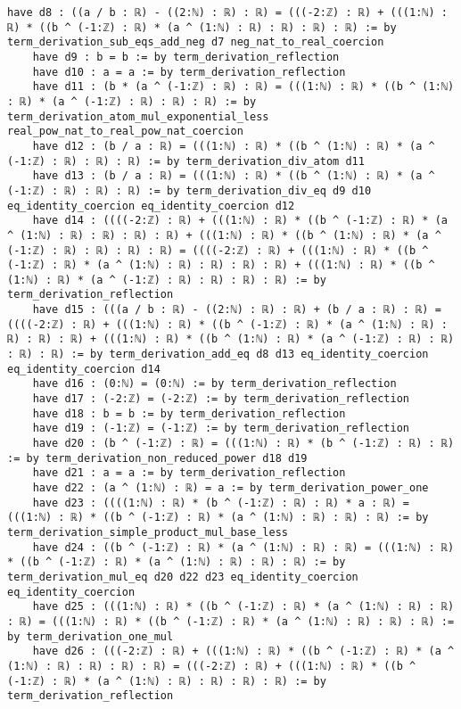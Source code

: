 \documentclass{article}
\begin{document}
\begin{tcolorbox}[colback=white!10, width=\linewidth]
\begin{lstlisting}[language=Lean4]
    have d8 : ((a / b : ℝ) - ((2:ℕ) : ℝ) : ℝ) = (((-2:ℤ) : ℝ) + (((1:ℕ) : ℝ) * ((b ^ (-1:ℤ) : ℝ) * (a ^ (1:ℕ) : ℝ) : ℝ) : ℝ) : ℝ) := by term_derivation_sub_eqs_add_neg d7 neg_nat_to_real_coercion
    have d9 : b = b := by term_derivation_reflection
    have d10 : a = a := by term_derivation_reflection
    have d11 : (b * (a ^ (-1:ℤ) : ℝ) : ℝ) = (((1:ℕ) : ℝ) * ((b ^ (1:ℕ) : ℝ) * (a ^ (-1:ℤ) : ℝ) : ℝ) : ℝ) := by term_derivation_atom_mul_exponential_less real_pow_nat_to_real_pow_nat_coercion
    have d12 : (b / a : ℝ) = (((1:ℕ) : ℝ) * ((b ^ (1:ℕ) : ℝ) * (a ^ (-1:ℤ) : ℝ) : ℝ) : ℝ) := by term_derivation_div_atom d11
    have d13 : (b / a : ℝ) = (((1:ℕ) : ℝ) * ((b ^ (1:ℕ) : ℝ) * (a ^ (-1:ℤ) : ℝ) : ℝ) : ℝ) := by term_derivation_div_eq d9 d10 eq_identity_coercion eq_identity_coercion d12
    have d14 : ((((-2:ℤ) : ℝ) + (((1:ℕ) : ℝ) * ((b ^ (-1:ℤ) : ℝ) * (a ^ (1:ℕ) : ℝ) : ℝ) : ℝ) : ℝ) + (((1:ℕ) : ℝ) * ((b ^ (1:ℕ) : ℝ) * (a ^ (-1:ℤ) : ℝ) : ℝ) : ℝ) : ℝ) = ((((-2:ℤ) : ℝ) + (((1:ℕ) : ℝ) * ((b ^ (-1:ℤ) : ℝ) * (a ^ (1:ℕ) : ℝ) : ℝ) : ℝ) : ℝ) + (((1:ℕ) : ℝ) * ((b ^ (1:ℕ) : ℝ) * (a ^ (-1:ℤ) : ℝ) : ℝ) : ℝ) : ℝ) := by term_derivation_reflection
    have d15 : (((a / b : ℝ) - ((2:ℕ) : ℝ) : ℝ) + (b / a : ℝ) : ℝ) = ((((-2:ℤ) : ℝ) + (((1:ℕ) : ℝ) * ((b ^ (-1:ℤ) : ℝ) * (a ^ (1:ℕ) : ℝ) : ℝ) : ℝ) : ℝ) + (((1:ℕ) : ℝ) * ((b ^ (1:ℕ) : ℝ) * (a ^ (-1:ℤ) : ℝ) : ℝ) : ℝ) : ℝ) := by term_derivation_add_eq d8 d13 eq_identity_coercion eq_identity_coercion d14
    have d16 : (0:ℕ) = (0:ℕ) := by term_derivation_reflection
    have d17 : (-2:ℤ) = (-2:ℤ) := by term_derivation_reflection
    have d18 : b = b := by term_derivation_reflection
    have d19 : (-1:ℤ) = (-1:ℤ) := by term_derivation_reflection
    have d20 : (b ^ (-1:ℤ) : ℝ) = (((1:ℕ) : ℝ) * (b ^ (-1:ℤ) : ℝ) : ℝ) := by term_derivation_non_reduced_power d18 d19
    have d21 : a = a := by term_derivation_reflection
    have d22 : (a ^ (1:ℕ) : ℝ) = a := by term_derivation_power_one
    have d23 : ((((1:ℕ) : ℝ) * (b ^ (-1:ℤ) : ℝ) : ℝ) * a : ℝ) = (((1:ℕ) : ℝ) * ((b ^ (-1:ℤ) : ℝ) * (a ^ (1:ℕ) : ℝ) : ℝ) : ℝ) := by term_derivation_simple_product_mul_base_less
    have d24 : ((b ^ (-1:ℤ) : ℝ) * (a ^ (1:ℕ) : ℝ) : ℝ) = (((1:ℕ) : ℝ) * ((b ^ (-1:ℤ) : ℝ) * (a ^ (1:ℕ) : ℝ) : ℝ) : ℝ) := by term_derivation_mul_eq d20 d22 d23 eq_identity_coercion eq_identity_coercion
    have d25 : (((1:ℕ) : ℝ) * ((b ^ (-1:ℤ) : ℝ) * (a ^ (1:ℕ) : ℝ) : ℝ) : ℝ) = (((1:ℕ) : ℝ) * ((b ^ (-1:ℤ) : ℝ) * (a ^ (1:ℕ) : ℝ) : ℝ) : ℝ) := by term_derivation_one_mul
    have d26 : (((-2:ℤ) : ℝ) + (((1:ℕ) : ℝ) * ((b ^ (-1:ℤ) : ℝ) * (a ^ (1:ℕ) : ℝ) : ℝ) : ℝ) : ℝ) = (((-2:ℤ) : ℝ) + (((1:ℕ) : ℝ) * ((b ^ (-1:ℤ) : ℝ) * (a ^ (1:ℕ) : ℝ) : ℝ) : ℝ) : ℝ) := by term_derivation_reflection

\end{lstlisting}
\end{tcolorbox}
\end{document}
